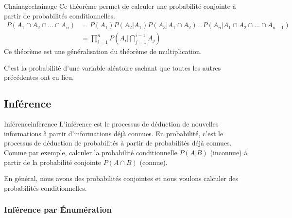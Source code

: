 

\begin{theorem}{Chainage}{chainage}
    Ce théorème permet de calculer une probabilité conjointe à partir de probabilités conditionnelles.
    \begin{align}
        P(A_1\cap A_2 \cap ... \cap A_n) &= P(A_1)P(A_2|A_1)P(A_3|A_1\cap A_2)...P(A_n|A_1\cap A_2 \cap ... \cap A_{n-1})\\
        &= \prod_{i=1}^{n} P(A_i|\bigcap_{j=1}^{i-1} A_j)
    \end{align}
    Ce théorème est une généralisation du théorème de multiplication.
\end{theorem}
\begin{remark}\leavevmode
    C'est la probabilité d'une variable aléatoire sachant que toutes les autres précédentes ont eu lieu.
\end{remark}

\subsection{Inférence} %
\label{sub:inference}

\begin{definition}{Inférence}{inference}
    L'inférence est le processus de déduction de nouvelles informations à partir d'informations déjà connues.
    En probabilité, c'est le processus de déduction de probabilités à partir de probabilités déjà connues. 
    Comme par exemple, calculer la probabilité conditionnelle $P(A|B)$ (inconnue) à partir de la probabilité conjointe $P(A\cap B)$ (connue).
\end{definition}

\begin{remark}\leavevmode
    En général, nous avons des probabilités conjointes et nous voulons calculer des probabilités conditionnelles.
\end{remark}

\subsubsection{Inférence par Énumération} %
\label{sec:inference_par_enumeration}

